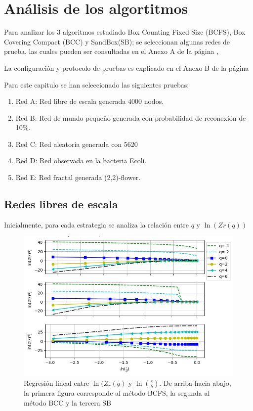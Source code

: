 \section{Análisis de los algortitmos}\label{sec:cap4analisis}

Para analizar los 3 algoritmos estudiado Box Counting Fixed Size (BCFS), Box Covering Compact (BCC) y SandBox(SB); se seleccionan algunas redes de prueba, las cuales pueden ser consultadas en el Anexo A de la página \pageref{AnexoA},

La configuración y protocolo de pruebas es explicado en el Anexo B de la página \pageref{AnexoB}

Para este capitulo se han seleccionado las siguientes pruebas:

\begin{enumerate}
    \item Red A: Red libre de escala generada 4000 nodos.
    \item Red B: Red de mundo pequeño generada con probabilidad de reconexión de 10\%.
    \item Red C: Red aleatoria generada con 5620
    \item Red D: Red observada en la bacteria Ecoli.
    \item Red E: Red fractal generada (2,2)-flower.
\end{enumerate}

\subsection{Redes libres de escala}

Inicialmente, para cada estrategia se analiza la relación entre $q$ y $\ln(Zr(q))$

\begin{figure}[H]
    \centering
    \includegraphics[scale=0.8]{Capitulo4Multifractalidad/imagenes/scaleFree4000_TqLnrBCscaleFree4000Nodes.png}

    \caption{Regresión lineal entre $\ln(Z_r(q)$ y $\ln(\frac{r}{b})$. De arriba hacia abajo, la primera figura corresponde al método BCFS, la segunda al método BCC y la tercera SB}
\end{figure}


